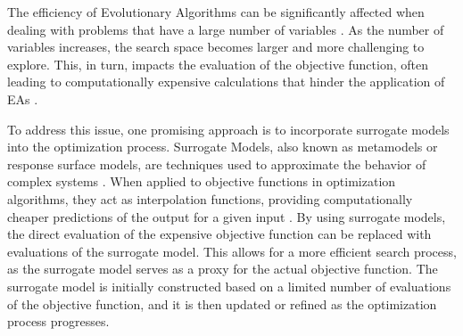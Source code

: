 	
	The efficiency of Evolutionary Algorithms can be significantly affected when dealing with problems that have a large number of variables \citep{gould2005numerical}. As the number of variables increases, the search space becomes larger and more challenging to explore. This, in turn, impacts the evaluation of the objective function, often leading to computationally expensive calculations that hinder the application of EAs \cite{omidvar2022review}.
	
	To address this issue, one promising approach is to incorporate surrogate models into the optimization process. Surrogate Models, also known as metamodels or response surface models, are techniques used to approximate the behavior of complex systems \cite{box1992,krige1951statistical,hardy1972multiquadric,boser1992training}. When applied to objective functions in optimization algorithms, they act as interpolation functions, providing computationally cheaper predictions of the output for a given input \citep{he2023review}. By using surrogate models, the direct evaluation of the expensive objective function can be replaced with evaluations of the surrogate model. This allows for a more efficient search process, as the surrogate model serves as a proxy for the actual objective function. The surrogate model is initially constructed based on a limited number of evaluations of the objective function, and it is then updated or refined as the optimization process progresses.
	
